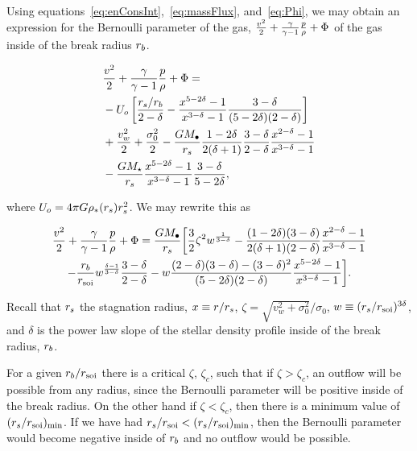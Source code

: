 
Using equations~\eqref{eq:enConsInt},~\eqref{eq:massFlux},
and~\eqref{eq:Phi}, we may obtain an expression for the Bernoulli
parameter of the gas, $\frac{v^2}{2}+\frac{\gamma}{\gamma-1} \frac{p}{\rho} +\Phi$ of the gas inside
of the break radius $r_b$.

\begin{align}
  &\frac{v^2}{2}+\frac{\gamma}{\gamma-1} \frac{p}{\rho} +\Phi = \nonumber\\
  &-U_o\left[\frac{r_s/r_b}{2-\delta}-\frac{x^{5-2\delta}-1}{x^{3-\delta}-1}\frac{3-\delta}{(5-2\delta)(2-\delta)}\right]\nonumber\\
  &+\frac{v_w^2}{2}+\frac{\sigma_0^2}{2}- \frac{G M_{\bullet}}{r_s}
  \frac{1-2\delta}{2(\delta+1)} \frac{3-\delta}{2-\delta}\frac{x^{2-\delta}-1}{x^{3-\delta}-1}
  \nonumber\\
  &-\frac{G M_\star}{r_s}
  \frac{x^{5-2\delta}-1}{x^{3-\delta}-1}\frac{3-\delta}{5-2\delta},
\end{align}

where $U_o=4 \pi G \rho_*(r_s) r_s^2$.  We may rewrite this as 

\begin{multline}
  \frac{v^2}{2}+\frac{\gamma}{\gamma-1} \frac{p}{\rho}+\Phi
=\frac{G M_{\bullet}}{r_s} 
\biggl[
  \frac{3}{2} \zeta^2 w^{\frac{1}{3 -\delta}}
  -\frac{(1-2\delta)(3-\delta)}{2(\delta+1)(2-\delta)}  \frac{x^{2  -\delta}-1}{x^{3-\delta}-1}\\
  -\frac{r_b}{r_{\rm soi}} w^{\frac{\delta-1}{3-\delta}} \frac{3 -\delta}{2 -\delta} 
  -w \frac{(2-\delta)(3-\delta)-(3-\delta)^{2}}{(5-2\delta)(2-\delta)} \frac{x^{5-2\delta}-1}{x^{3-\delta}-1}
\biggr].
\label{eq:enthAnal}
\end{multline}

Recall that $r_s$ the stagnation radius, $x\equiv r/r_s$, $\zeta=\sqrt{v_w^2+\sigma_0^2}/\sigma_0$, $w\equiv (r_s/r_{\rm soi})^{3\delta}$, and
$\delta$ is the power law slope of the stellar density profile inside
of the break radius, $r_b$.

 For a given $r_b/r_{\rm soi}$ there is a critical $\zeta$, $\zeta_{c}$, such
 that if $\zeta>\zeta_c$, an outflow will be possible from any
radius, since the Bernoulli parameter will be positive inside of the
break radius. On the other hand if $\zeta<\zeta_c$, then there is a
minimum value of $(r_s/r_{\rm soi})_{\rm min}$. If we have had
$r_s/r_{\rm soi}<(r_s/r_{\rm soi})_{\rm min}$, then the Bernoulli parameter would
become negative inside of $r_b$ and no outflow would be possible.

